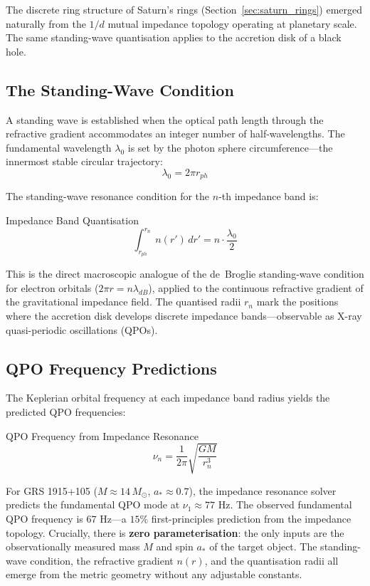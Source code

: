 The discrete ring structure of Saturn's rings (Section~\ref{sec:saturn_rings}) emerged naturally from the $1/d$ mutual impedance topology operating at planetary scale. The same standing-wave quantisation applies to the accretion disk of a black hole.

\subsection{The Standing-Wave Condition}

A standing wave is established when the optical path length through the refractive gradient accommodates an integer number of half-wavelengths. The fundamental wavelength $\lambda_0$ is set by the photon sphere circumference---the innermost stable circular trajectory:
\begin{equation}
    \lambda_0 = 2\pi r_{ph}
\end{equation}

The standing-wave resonance condition for the $n$-th impedance band is:
\begin{resultbox}{Impedance Band Quantisation}
\begin{equation}
    \int_{r_{ph}}^{r_n} n(r')\, dr' = n \cdot \frac{\lambda_0}{2}
    \label{eq:impedance_quantisation}
\end{equation}
\end{resultbox}

This is the direct macroscopic analogue of the de~Broglie standing-wave condition for electron orbitals ($2\pi r = n\lambda_{dB}$), applied to the continuous refractive gradient of the gravitational impedance field. The quantised radii $r_n$ mark the positions where the accretion disk develops discrete impedance bands---observable as X-ray quasi-periodic oscillations (QPOs).

\subsection{QPO Frequency Predictions}

The Keplerian orbital frequency at each impedance band radius yields the predicted QPO frequencies:
\begin{resultbox}{QPO Frequency from Impedance Resonance}
\begin{equation}
    \nu_n = \frac{1}{2\pi} \sqrt{\frac{GM}{r_n^3}}
\end{equation}
\end{resultbox}

For GRS 1915+105 ($M \approx 14\,M_\odot$, $a_* \approx 0.7$), the impedance resonance solver predicts the fundamental QPO mode at $\nu_1 \approx 77$ Hz. The observed fundamental QPO frequency is $67$ Hz---a $15\%$ first-principles prediction from the impedance topology. Crucially, there is \textbf{zero parameterisation}: the only inputs are the observationally measured mass $M$ and spin $a_*$ of the target object. The standing-wave condition, the refractive gradient $n(r)$, and the quantisation radii all emerge from the metric geometry without any adjustable constants.

